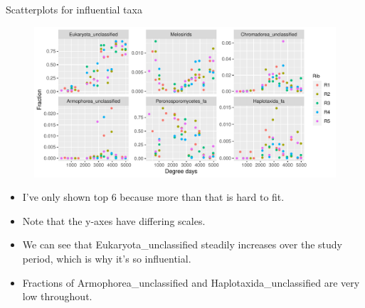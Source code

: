 \documentclass{beamer}
\begin{document}
\begin{frame}{Scatterplots for influential taxa}

  \begin{center}
    \begin{figure}
      \includegraphics[width=4.75in]{w_ribs/infl_rib_family_scatter}
    \end{figure}
  \end{center}
  \vspace{-0.25in}
  {\scriptsize
  \begin{itemize}
  \item I've only shown top 6 because more than that is hard to fit.
  \item Note that the y-axes have differing scales.
  \item We can see that Eukaryota\_unclassified steadily increases over the
  study period, which is why it's so influential.
  \item Fractions of Armophorea\_unclassified and Haplotaxida\_unclassified are
  very low throughout.
  \end{itemize}
  }

\end{frame}
\end{document}
